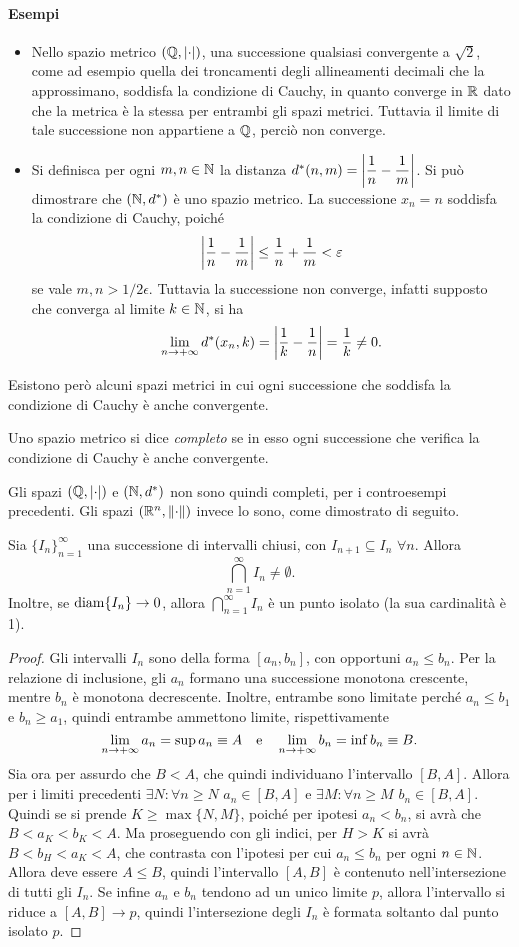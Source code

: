 \paragraph{Esempi}
\begin{itemize}
\item Nello spazio metrico $(\mathbb{Q},\left|{\cdot}\right|)$, una successione qualsiasi convergente a $\sqrt{2}$, come ad esempio quella dei troncamenti degli allineamenti decimali che la approssimano, soddisfa la condizione di Cauchy, in quanto converge in $\mathbb{R}$ dato che la metrica è la stessa per entrambi gli spazi metrici. Tuttavia il limite di tale successione non appartiene a $\mathbb{Q}$, perciò non converge.
\item Si definisca per ogni $m,n\in\mathbb{N}$ la distanza $d^*(n,m)=\left|{\dfrac1{n}-\dfrac1{m}}\right|$. Si può dimostrare che $(\mathbb{N},d^*)$ è uno spazio metrico. La successione $x_n=n$ soddisfa la condizione di Cauchy, poiché
\[
\left|{\frac1{n}-\frac1{m}}\right|\leq\frac1{n}+\frac1{m}<\varepsilon
\]
se vale $m,n>1/2\epsilon$. Tuttavia la successione non converge, infatti supposto che converga al limite $k\in\mathbb{N}$, si ha
\[
\lim_{n\to +\infty} d^*(x_n,k)=\left|{\frac1{k}-\frac1{n}}\right|=\frac1{k}\neq 0.
\]
\end{itemize}
Esistono però alcuni spazi metrici in cui ogni successione che soddisfa la condizione di Cauchy è anche convergente.
\begin{definizione}
Uno spazio metrico si dice \emph{completo} se in esso ogni successione che verifica la condizione di Cauchy è anche convergente.
\end{definizione}
Gli spazi $(\mathbb{Q},\left|{\cdot}\right|)$ e $(\mathbb{N},d^*)$ non sono quindi completi, per i controesempi precedenti. Gli spazi $(\mathbb{R}^n,\left\|{\cdot}\right\|)$ invece lo sono, come dimostrato di seguito.
\begin{lemma}
Sia $\{I_n\}_{n=1}^{\infty}$ una successione di intervalli chiusi, con $I_{n+1}\subseteq I_n$ $\forall n$. Allora
\[
\bigcap_{n=1}^{\infty} I_n\neq\emptyset.
\]
Inoltre, se $\operatorname{diam}\{I_n\}\to 0$, allora $\bigcap_{n=1}^{\infty} I_n$ è un punto isolato (la sua cardinalità è 1).
\end{lemma}
\begin{proof}
Gli intervalli $I_n$ sono della forma $[a_n,b_n]$, con opportuni $a_n\leq b_n$. Per la relazione di inclusione, gli $a_n$ formano una successione monotona crescente, mentre $b_n$ è monotona decrescente. Inoltre, entrambe sono limitate perché $a_n\leq b_1$ e $b_n\geq a_1$, quindi entrambe ammettono limite, rispettivamente
\[
\lim_{n\to+\infty}a_n=\sup a_n\equiv A\quad\text{e}\quad\lim_{n\to+\infty}b_n=\inf b_n\equiv B.
\]
Sia ora per assurdo che $B<A$, che quindi individuano l'intervallo $[B,A]$. Allora per i limiti precedenti $\exists N\colon\forall n\geq N$ $a_n\in[B,A]$ e $\exists M\colon\forall n\geq M$ $b_n\in[B,A]$. Quindi se si prende $K\geq\max\{N,M\}$, poiché per ipotesi $a_n<b_n$, si avrà che $B<a_K<b_K<A$. Ma proseguendo con gli indici, per $H>K$ si avrà $B<b_H<a_K<A$, che contrasta con l'ipotesi per cui $a_n\leq b_n$ per ogni $n\in\mathbb{N}$. Allora deve essere $A\leq B$, quindi l'intervallo $[A,B]$ è contenuto nell'intersezione di tutti gli $I_n$. Se infine $a_n$ e $b_n$ tendono ad un unico limite $p$, allora l'intervallo si riduce a $[A,B]\to p$, quindi l'intersezione degli $I_n$ è formata soltanto dal punto isolato $p$.
\end{proof}

